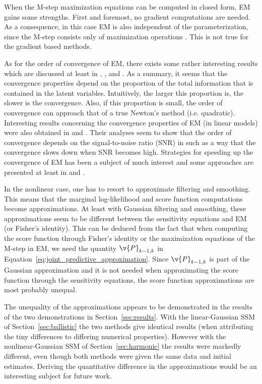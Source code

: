 When the M-step maximization equations
can be computed in closed form, EM gains some strengths.
First and foremost, no gradient computations are needed.
As a consequence, in this case EM is also independent
of the parameterization, since the M-step consists only of
maximization operations \parencite{Cappe2005}. This is not true
for the gradient based methods.

As for the order of convergence of EM, there exists some rather interesting results
which are discussed at least in 
\textcite{Salakhutdinov2003,Salakhutdinov2004},
\textcite{Petersen2005a}, and \textcite{Gibson2005}. As a summary,
it seems that the convergence properties depend on the proportion 
of the total information that is contained in the latent variables. Intuitively,
the larger this proportion is, the slower is the convergence. Also, if this proportion
is small, the order of convergence can approach that of a true Newton's method (i.e. quadratic).
Interesting results concerning the convergence properties of EM (in linear models) were also
obtained in \textcite{Petersen2005a} and \textcite{Petersen2005}. Their analyses seem
to show that the order of convergence depends on the signal-to-noise ratio (SNR) in
such as a way that the convergence slows down when SNR becomes high.
Strategies for speeding up the convergence of EM has been
a subject of much interest and some approaches are presented at least
in \textcite{Meng1997} and \textcite{Lange1995}.

In the nonlinear case, one has to resort to approximate filtering and smoothing.
This means that the marginal log-likelihood and score function computations 
become approximations.
At least with Gaussian filtering and smoothing, these approximations seem to be different between
the sensitivity equations and EM (or Fisher's identity). This can be deduced from the fact
that when computing the score function through Fisher's identity or the maximization equations of
the M-step in EM, we need the quantity $\v{P}_{k-1,k}$ in
Equation~\eqref{eq:joint_predictive_approximation}. Since $\v{P}_{k-1,k}$ is part
of the Gaussian approximation and it is not needed when approximating the score function
through the sensitivity equations, the score function approximations
are most probably unequal.  

The unequality of the approximations appears to be demonstrated in
the results of the two demonstrations in Section~\ref{sec:results}. 
With the linear-Gaussian SSM of Section~\ref{sec:ballistic} the two methods give identical results 
(when attributing the tiny differences
to differing numerical properties). 
However with the nonlinear-Gaussian SSM 
of Section~\ref{sec:harmonic} the results
were markedly different, even though both methods were given the same data and initial estimates.
Deriving the quantitative difference in the approximations would be an interesting subject
for future work.



